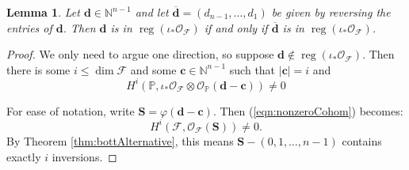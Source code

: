 \documentclass[10pt,a4paper]{amsart}
\newtheorem{lemma}{Lemma}
\newcommand{\calF}{{\mathcal{F}}}
\newcommand{\calO}{{\mathcal{O}}}
\newcommand{\reg}{\operatorname{reg}}
\begin{document}
\begin{lemma}
\label{lemma:reverse}
    Let $\mathbf d \in \mathbb N^{n-1}$ and let $\overline{\mathbf d} = (d_{n-1},\ldots,d_1)$ be given by reversing the entries of $\mathbf d$.  Then $\mathbf d$ is in $\reg(\iota_*\calO_{\calF})$ if and only if $\overline{\mathbf d}$ is in $\reg(\iota_*\calO_{\calF})$.
\end{lemma}

\begin{proof}
    We only need to argue one direction, so suppose $\mathbf d \notin \reg(\iota_*\calO_{\calF})$. Then there is some $i \leq \dim \calF$ and some $\mathbf c \in \mathbb N^{n-1}$ such that $|\mathbf c| = i$ and 
    \begin{equation}\label{eqn:nonzeroCohom}
        H^i(\mathbb P,\iota_*\calO_{\calF}\otimes \calO_{\mathbb P}(\mathbf d-\mathbf c)) \neq 0
    \end{equation}
    
    For ease of notation, write $\mathbf S = \varphi(\mathbf d - \mathbf c)$.  Then (\ref{eqn:nonzeroCohom}) becomes:
    \begin{equation}\label{eqn:nonzeroCohom2}
        H^i(\calF,\calO_{\calF}(\mathbf S)) \neq 0.
    \end{equation}
    By Theorem \ref{thm:bottAlternative}, this means $\mathbf S - (0,1,\ldots,n-1)$ contains exactly $i$ inversions.  
    

\end{proof}
\end{document}

